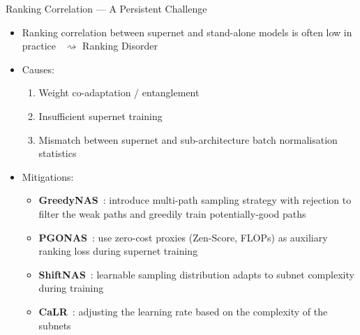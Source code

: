 \documentclass[main]{subfiles}
\begin{document}
\begin{frame}{Ranking Correlation — A Persistent Challenge}
\begin{itemize}
    \item Ranking correlation between supernet and stand-alone models is \alert{often low in practice}~ $\rightsquigarrow$ Ranking Disorder
    \item Causes:
    \begin{enumerate}
        \item Weight co-adaptation / entanglement
        \item Insufficient supernet training
        \item Mismatch between supernet and sub-architecture batch normalisation statistics
    \end{enumerate}
    \item Mitigations:
    \begin{itemize}
        \item \textbf{GreedyNAS}~: introduce multi-path sampling strategy with rejection to filter the weak paths and greedily train potentially-good paths
        \item \textbf{PGONAS}~: use zero-cost proxies (Zen-Score, FLOPs) as auxiliary ranking loss during supernet training
        \item \textbf{ShiftNAS}~: learnable sampling distribution adapts to subnet complexity during training
        \item \textbf{CaLR}~: adjusting the learning rate based on the complexity of the subnets        
    \end{itemize}
\end{itemize}
\end{frame}
\end{document}
